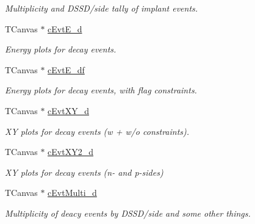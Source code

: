 \begin{DoxyCompactItemize}
\begin{DoxyCompactList}\small\item\em Multiplicity and D\-S\-S\-D/side tally of implant events. \end{DoxyCompactList}\item 
\hypertarget{classAnalysis_a00da12986b9c4a58de065cadc2d11411}{T\-Canvas $\ast$ \hyperlink{classAnalysis_a00da12986b9c4a58de065cadc2d11411}{c\-Evt\-E\-\_\-d}}\label{classAnalysis_a00da12986b9c4a58de065cadc2d11411}

\begin{DoxyCompactList}\small\item\em Energy plots for decay events. \end{DoxyCompactList}\item 
\hypertarget{classAnalysis_a4d3014d04cf5f6da148eb15ce315e00b}{T\-Canvas $\ast$ \hyperlink{classAnalysis_a4d3014d04cf5f6da148eb15ce315e00b}{c\-Evt\-E\-\_\-df}}\label{classAnalysis_a4d3014d04cf5f6da148eb15ce315e00b}

\begin{DoxyCompactList}\small\item\em Energy plots for decay events, with flag constraints. \end{DoxyCompactList}\item 
\hypertarget{classAnalysis_a5c09b88243080060a287d05fca4b0204}{T\-Canvas $\ast$ \hyperlink{classAnalysis_a5c09b88243080060a287d05fca4b0204}{c\-Evt\-X\-Y\-\_\-d}}\label{classAnalysis_a5c09b88243080060a287d05fca4b0204}

\begin{DoxyCompactList}\small\item\em X\-Y plots for decay events (w + w/o constraints). \end{DoxyCompactList}\item 
\hypertarget{classAnalysis_a08bf4b0f4ea006bd58716b197b7b327b}{T\-Canvas $\ast$ \hyperlink{classAnalysis_a08bf4b0f4ea006bd58716b197b7b327b}{c\-Evt\-X\-Y2\-\_\-d}}\label{classAnalysis_a08bf4b0f4ea006bd58716b197b7b327b}

\begin{DoxyCompactList}\small\item\em X\-Y plots for decay events (n-\/ and p-\/sides) \end{DoxyCompactList}\item 
\hypertarget{classAnalysis_a0a9c723b9a7666457edfec40dad2c243}{T\-Canvas $\ast$ \hyperlink{classAnalysis_a0a9c723b9a7666457edfec40dad2c243}{c\-Evt\-Multi\-\_\-d}}\label{classAnalysis_a0a9c723b9a7666457edfec40dad2c243}

\begin{DoxyCompactList}\small\item\em Multiplicity of deacy events by D\-S\-S\-D/side and some other things. \end{DoxyCompactList}\end{DoxyCompactItemize}


